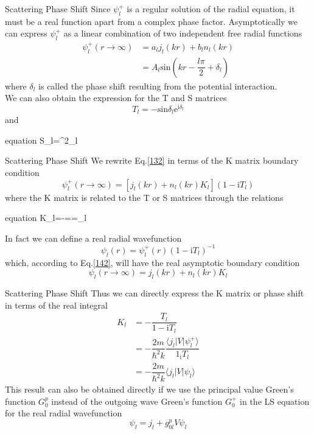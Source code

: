 \documentclass{beamer}
\begin{document}
	\begin{frame}{Scattering Phase Shift}
		Since $\psi_l^+$ is a regular solution of the radial equation, it must be a real function apart from a complex phase factor. Asymptotically we can express $\psi_l^+$ as a linear combination of two independent free radial functions
		\begin{align}
			\psi_l^+(r\rightarrow\infty)&=a_lj_l(kr)+b_ln_l(kr)\nonumber\\
			&=A_l\mathrm{sin}\left( kr-\dfrac{l\pi}{2}+\delta_l\right) 
		\end{align}
		where $\delta_l$ is called the phase shift resulting from the potential interaction.\\
		We can also obtain the expression for the T and S matrices
		\begin{equation}
			T_l=-\mathrm{sin}\delta_l\mathrm{e}^{\mathrm{i}\delta_l}
		\end{equation}
		and
		\begin{empheq}[box=\fbox]{equation}
			S_l=^{2\delta_l}
		\end{empheq}
	\end{frame}
	\begin{frame}{Scattering Phase Shift}
		We rewrite Eq.\eqref{132} in terms of the K matrix boundary condition
		\begin{equation}
			\psi_l^+(r\rightarrow\infty)=[j_l(kr)+n_l(kr)K_l](1-\mathrm{i}T_l)
			\label{142}
		\end{equation}
		where the K matrix is related to the T or S matrices through the relations
		\begin{empheq}[box=\fbox]{equation}
			K_l=-==\delta_l
		\end{empheq}
		In fact we can define a real radial wavefunction
		\begin{equation}
			\psi_l(r)=\psi_l^+(r)(1-\mathrm{i}T_l)^{-1}
		\end{equation}
		which, according to Eq.\eqref{142}, will have the real asymptotic boundary condition
		\begin{equation}
			\psi_l(r\rightarrow\infty)=j_l(kr)+n_l(kr)K_l
		\end{equation}
	\end{frame}
	\begin{frame}{Scattering Phase Shift}
		Thus we can directly express the K matrix or phase shift in terms of the real integral
		\begin{align}
			K_l&=-\dfrac{T_l}{1-\mathrm{i}T_l}\nonumber\\
			&=-\dfrac{2m}{\hbar^2k}\dfrac{\langle j_l|V|\psi_l^+\rangle}{1_\mathrm{i}T_l}\nonumber\\
			&=-\dfrac{2m}{\hbar^2k}\langle j_l|V|\psi_l\rangle
		\end{align}
		This result can also be obtained directly if we use the principal value Green's function $G_0^p$ instead of the outgoing wave Green's function $G_0^+$ in the LS equation for the real radial wavefunction
		\begin{equation}
			\psi_l=j_l+g_{0l}^pV\psi_l
		\end{equation}
	\end{frame}
\end{document}

